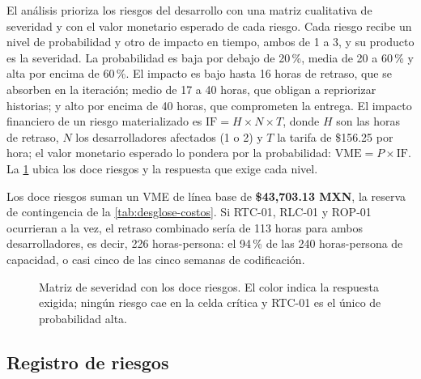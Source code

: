El análisis prioriza los riesgos del desarrollo con una matriz cualitativa de severidad y con el valor monetario esperado de cada riesgo. Cada riesgo recibe un nivel de probabilidad y otro de impacto en tiempo, ambos de 1 a 3, y su producto es la severidad. La probabilidad es baja por debajo de 20\,\%, media de 20 a 60\,\% y alta por encima de 60\,\%. El impacto es bajo hasta 16 horas de retraso, que se absorben en la iteración; medio de 17 a 40 horas, que obligan a repriorizar historias; y alto por encima de 40 horas, que comprometen la entrega. El impacto financiero de un riesgo materializado es $\mathrm{IF} = H \times N \times T$, donde $H$ son las horas de retraso, $N$ los desarrolladores afectados (1 o 2) y $T$ la tarifa de \$156.25 por hora; el valor monetario esperado lo pondera por la probabilidad: $\mathrm{VME} = P \times \mathrm{IF}$. La \cref{fig:matriz-riesgos} ubica los doce riesgos y la respuesta que exige cada nivel.

Los doce riesgos suman un VME de línea base de \textbf{\$43,703.13 MXN}, la reserva de contingencia de la \cref{tab:desglose-costos}. Si RTC-01, RLC-01 y ROP-01 ocurrieran a la vez, el retraso combinado sería de 113 horas para ambos desarrolladores, es decir, 226 horas-persona: el 94\,\% de las 240 horas-persona de capacidad, o casi cinco de las cinco semanas de codificación.

\begin{figure}[htbp]
  \centering
  
  \caption{Matriz de severidad con los doce riesgos. El color indica la respuesta exigida; ningún riesgo cae en la celda crítica y RTC-01 es el único de probabilidad alta.}
  \label{fig:matriz-riesgos}
\end{figure}

\newcommand{\RiesgoFila}[8]{\textbf{#1} & #2 & #3 & #4 & #5 & #6 & #7 \\*
  \multicolumn{7}{@{}>{\raggedright\arraybackslash\leftskip=1em}p{\linewidth}@{}}{#8} \\ \addlinespace[4pt]}
\newcommand{\RiesgoEnc}{\toprule
  \textbf{ID} & \textbf{Riesgo} & \textbf{P} & \textbf{I} & \textbf{Severidad} & \textbf{VME} & \textbf{Objetivos} \\
  \midrule}

\subsection{Registro de riesgos}\label{sec:riesgos-tecnicos}

